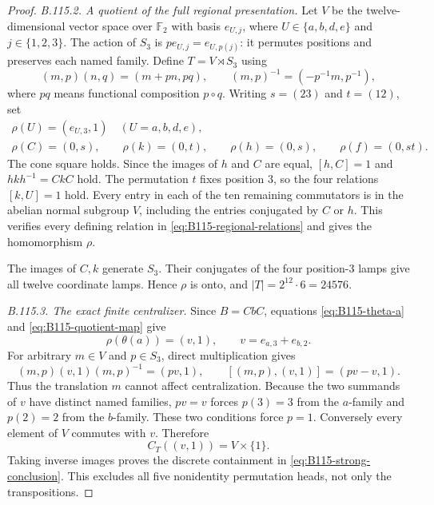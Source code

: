 \begin{proof}
\emph{B.115.2. A quotient of the full regional presentation.}
Let $V$ be the twelve-dimensional vector space over $\mathbb F_2$
with basis $e_{U,j}$, where $U\in\{a,b,d,e\}$ and
$j\in\{1,2,3\}$. The action of $S_3$ is
$p e_{U,j}=e_{U,p(j)}$: it permutes positions and preserves each
named family. Define $T=V\rtimes S_3$ using
\begin{equation}\label{eq:B115-target-law}
 (m,p)(n,q)=(m+p n,pq),\qquad
 (m,p)^{-1}=(-p^{-1}m,p^{-1}),
\end{equation}
where $pq$ means functional composition $p\circ q$.
Writing $s=(23)$ and $t=(12)$, set
\begin{equation}\label{eq:B115-quotient-map}
 \begin{gathered}
 \rho(U)=(e_{U,3},1)\quad(U=a,b,d,e),\\
 \rho(C)=(0,s),\qquad \rho(k)=(0,t),\qquad
 \rho(h)=(0,s),\qquad \rho(f)=(0,st).
 \end{gathered}
\end{equation}
The cone square holds. Since the images of $h$ and $C$ are equal,
$[h,C]=1$ and $hkh^{-1}=CkC$ hold. The permutation $t$ fixes
position $3$, so the four relations $[k,U]=1$ hold. Every entry
in each of the ten remaining commutators is in the abelian normal
subgroup $V$, including the entries conjugated by $C$ or $h$.
This verifies every defining relation in
\eqref{eq:B115-regional-relations} and gives the homomorphism $\rho$.

The images of $C,k$ generate $S_3$. Their conjugates of the four
position-$3$ lamps give all twelve coordinate lamps. Hence $\rho$
is onto, and $|T|=2^{12}\cdot6=24576$.

\emph{B.115.3. The exact finite centralizer.}
Since $B=CbC$, equations \eqref{eq:B115-theta-a} and
\eqref{eq:B115-quotient-map} give
\[
 \rho(\theta(a))=(v,1),\qquad v=e_{a,3}+e_{b,2}.
\]
For arbitrary $m\in V$ and $p\in S_3$, direct multiplication gives
\begin{equation}\label{eq:B115-target-conjugation}
 (m,p)(v,1)(m,p)^{-1}=(pv,1),\qquad
 [(m,p),(v,1)]=(pv-v,1).
\end{equation}
Thus the translation $m$ cannot affect centralization. Because the
two summands of $v$ have distinct named families, $pv=v$ forces
$p(3)=3$ from the $a$-family and $p(2)=2$ from the $b$-family.
These two conditions force $p=1$. Conversely every element of $V$
commutes with $v$. Therefore
\begin{equation}\label{eq:B115-exact-finite-centralizer}
 C_T((v,1))=V\times\{1\}.
\end{equation}
Taking inverse images proves the discrete containment in
\eqref{eq:B115-strong-conclusion}. This excludes all five
nonidentity permutation heads, not only the transpositions.


\end{proof}
